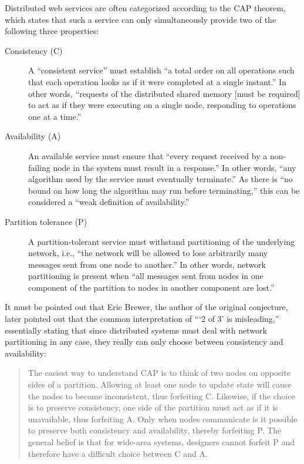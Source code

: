 Distributed web services are often categorized according to the CAP theorem, which states that such a service can only simultaneously provide two of the following three properties: \autocite{gilbert2002}

\begin{description}
	\item[Consistency (C)]
		A ``consistent service'' must establish ``a total order on all operations such that each operation looks as if it were completed at a single instant.''
		In other words, ``requests of the distributed shared memory [must be required] to act as if they were executing on a single node, responding to operations one at a time.''
	\item[Availability (A)]
		An available service must ensure that ``every request received by a non-failing node in the system must result in a response.''
		In other words, ``any algorithm used by the service must eventually terminate.''
		As there is ``no bound on how long the algorithm may run before terminating,'' this can be considered a ``weak definition of availability.''
	\item[Partition tolerance (P)]
		A partition-tolerant service must withstand partitioning of the underlying network, i.e., ``the network will be allowed to lose arbitrarily many messages sent from one node to another.''
		In other words, network partitioning is present when ``all messages sent from nodes in one component of the partition to nodes in another component are lost.''
\end{description}

It must be pointed out that Eric Brewer, the author of the original conjecture, later pointed out that the common interpretation of \enquote{\enquote{2 of 3} is misleading,} essentially stating that since distributed systems must deal with network partitioning in any case, they really can only choose between consistency and availability: \autocite{infoq2012caplater}

\begin{quote}
	The easiest way to understand CAP is to think of two nodes on opposite sides of a partition. Allowing at least one node to update state will cause the nodes to become inconsistent, thus forfeiting C.
	Likewise, if the choice is to preserve consistency, one side of the partition must act as if it is unavailable, thus forfeiting A.
	Only when nodes communicate is it possible to preserve both consistency and availability, thereby forfeiting P.
	The general belief is that for wide-area systems, designers cannot forfeit P and therefore have a difficult choice between C and A.
\end{quote}

